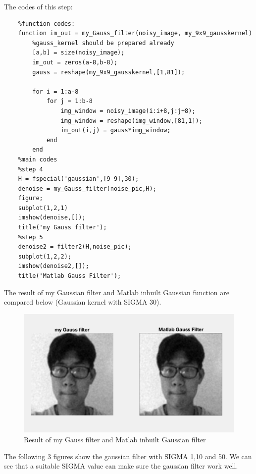 \documentclass{article}
\begin{document}
The codes of this step:
\begin{lstlisting}
    %function codes:
    function im_out = my_Gauss_filter(noisy_image, my_9x9_gausskernel)
        %gauss_kernel should be prepared already
        [a,b] = size(noisy_image);
        im_out = zeros(a-8,b-8);
        gauss = reshape(my_9x9_gausskernel,[1,81]);
        
        for i = 1:a-8
            for j = 1:b-8
                img_window = noisy_image(i:i+8,j:j+8);
                img_window = reshape(img_window,[81,1]);
                im_out(i,j) = gauss*img_window;
            end
        end
    %main codes
    %step 4
    H = fspecial('gaussian',[9 9],30);
    denoise = my_Gauss_filter(noise_pic,H);
    figure;
    subplot(1,2,1)
    imshow(denoise,[]);
    title('my Gauss filter');
    %step 5
    denoise2 = filter2(H,noise_pic);
    subplot(1,2,2);
    imshow(denoise2,[]);
    title('Matlab Gauss Filter');
\end{lstlisting}

The result of my Gaussian filter and Matlab inbuilt Gaussian function are compared below (Gaussian kernel with SIGMA 30).

\begin{figure}[htbp]
    \centering
    \includegraphics[scale = 0.6]{fig11.jpg}
    \caption{Result of my Gauss filter and Matlab inbuilt Gaussian filter}
    \label{fig11}
\end{figure}

The following 3 figures show the gaussian filter with SIGMA 1,10 and 50. We can see that a suitable SIGMA value can make sure the gaussian filter work well.
\end{document}
